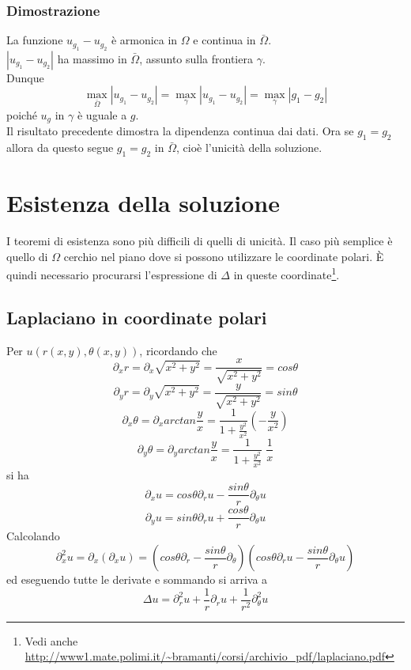 \subsubsection{Dimostrazione}
La funzione $u_{g_1} - u_{g_2}$ \`e armonica in $\Omega$ e continua in
$\bar{\Omega}$.\\
$\left| u_{g_1} - u_{g_2} \right|$ ha massimo in $\bar{\Omega}$, assunto sulla
frontiera $\gamma$. \\ Dunque
\[
	\max_{\bar{\Omega}} \left| u_{g_1} - u_{g_2} \right|=
	\max_{\gamma} \left| u_{g_1} - u_{g_2} \right|=
	\max_{\gamma} \left| g_1 - g_2 \right|
\]
poich\'e $u_g$ in $\gamma$ \`e uguale a $g$.\\
Il risultato precedente dimostra la dipendenza continua dai dati.
Ora se $g_1=g_2$ allora da questo segue $g_1=g_2$ in $\bar{\Omega}$, cio\`e
l'unicit\`a della soluzione.
\section{Esistenza della soluzione}
I teoremi di esistenza sono pi\`u difficili di quelli di unicit\`a.
Il caso pi\`u semplice \`e quello di $\Omega$ cerchio nel piano dove si
possono utilizzare le coordinate polari. \`E quindi necessario procurarsi
l'espressione di $\Delta$ in queste coordinate\footnote{Vedi anche
\url{http://www1.mate.polimi.it/~bramanti/corsi/archivio_pdf/laplaciano.pdf}}.
\subsection{Laplaciano in coordinate polari}
Per $u(r(x,y), \theta (x,y))$, ricordando che
\[
	\partial_x r= \partial_x\sqrt{x^2 + y^2}=\frac{x}{\sqrt{x^2 + y^2}}= cos
\theta
\]
\[
	\partial_y r= \partial_y\sqrt{x^2 + y^2}=\frac{y}{\sqrt{x^2 + y^2}}= sin
\theta
\]
\[
	\partial_x \theta= \partial_x arctan \frac{y}{x}=
	\frac{1}{1 +\frac{y^2}{x^2}} \left( - \frac{y}{x^2} \right)
\]
\[
	\partial_y \theta= \partial_y arctan \frac{y}{x}=
	\frac{1}{1 +\frac{y^2}{x^2}} \; \frac{1}{x}
\]
si ha
\[
	\partial_x u= cos \theta \partial_r u - \frac{sin \theta}{r}
\partial_{\theta} u
\]
\[
	\partial_y u= sin \theta \partial_r u + \frac{cos \theta}{r}
\partial_{\theta} u
\]
Calcolando
\[
	\partial_x^2 u = \partial_x(\partial_x u)=
	\left( cos \theta \partial_r  - \frac{sin \theta}{r} \partial_{\theta}
\right)
	\left( cos \theta \partial_r u - \frac{sin \theta}{r} \partial_{\theta}
u \right)
\]
ed eseguendo tutte le derivate e sommando si arriva a
\[
	\Delta u = \partial^2_r u + \frac{1}{r} \partial_r u
+\frac{1}{r^2}\partial^2_{\theta} u
\]
